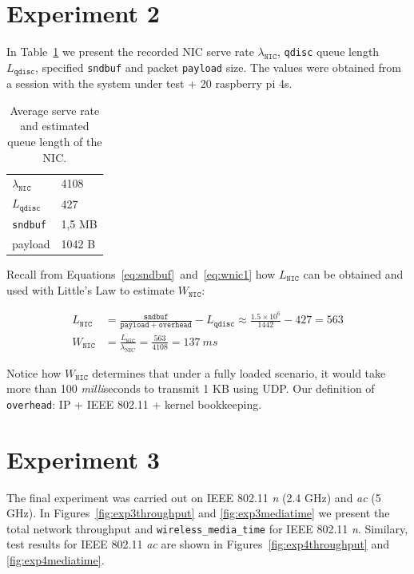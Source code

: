\section{Experiment 2}

In Table~\ref{tab:exp2data} we present the recorded NIC serve rate
$\lambda_{\mathtt{NIC}}$, \texttt{qdisc} queue length $L_{\mathtt{qdisc}}$,
specified \texttt{sndbuf} and packet \texttt{payload} size. The values were
obtained from a session with the system under test + 20 raspberry pi 4s.

\begin{table}[tbp]
  \centering
  \begin{tabular}{ll}
    $\lambda_{\mathtt{NIC}}$ & 4108 \\
    $L_\mathtt{qdisc}$ & 427 \\
    \texttt{sndbuf} & 1,5 MB \\
    payload & 1042 B
  \end{tabular}
  \caption{Average serve rate and estimated queue length of the NIC.}
  \label{tab:exp2data}
\end{table}

Recall from Equations~\ref{eq:sndbuf}~and~\ref{eq:wnic1} how
$L_{\mathtt{NIC}}$ can be obtained and used with Little's Law to estimate
$W_{\mathtt{NIC}}$:

\begin{align*}
L_{\mathtt{NIC}} &= \frac{\mathtt{sndbuf}}{\mathtt{payload} + \mathtt{overhead}} - L_\mathtt{qdisc} \approx \frac{1.5 \times 10^6}{1442} - 427 = 563 \\
W_\mathtt{NIC} &= \frac{L_{\mathtt{NIC}}}{\lambda_\text{NIC}} = \frac{563}{4108} = 137~ms
\end{align*}

Notice how $W_\mathtt{NIC}$ determines that under a fully loaded scenario, it
would take more than 100 \emph{milli}seconds to transmit 1 KB using UDP. Our
definition of \texttt{overhead}: IP + IEEE 802.11 + kernel bookkeeping.

\section{Experiment 3}

The final experiment was carried out on IEEE 802.11 \emph{n} (2.4 GHz) and
\emph{ac} (5 GHz). In Figures~\ref{fig:exp3throughput} and
\ref{fig:exp3mediatime} we present the total network throughput and
\texttt{wireless\_media\_time} for IEEE 802.11 \emph{n}. Similary, test
results for IEEE 802.11 \emph{ac} are shown in
Figures~\ref{fig:exp4throughput} and \ref{fig:exp4mediatime}.

